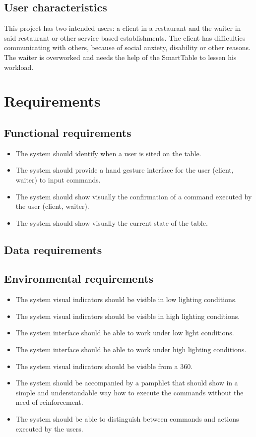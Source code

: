 \documentclass{article}
\begin{document}
\subsection{User characteristics}
This project has two intended users: a client in a restaurant and the waiter in said restaurant or other service based establishments.
The client has difficulties communicating with others, because of social anxiety, disability or other reasons. The waiter is overworked and
needs the help of the SmartTable to lessen his workload.
\section{Requirements}
\subsection{Functional requirements}
\begin{itemize}
    \item The system should identify when a user is sited on the table.
    \item The system should provide a hand gesture interface for the user (client, waiter) to input commands.
    \item The system should show visually the confirmation of a command executed by the user (client, waiter).
    \item The system should show visually the current state of the table.
\end{itemize}
\subsection{Data requirements}
\subsection{Environmental requirements}
\begin{itemize}
    \item The system visual indicators should be visible in low lighting conditions.
    \item The system visual indicators should be visible in high lighting conditions.
    \item The system interface should be able to work under low light conditions.
    \item The system interface should be able to work under high lighting conditions.
    \item The system visual indicators should be visible from a 360.
    \item The system should be accompanied by a pamphlet that should show in a simple and understandable way how to execute the commands without the need of reinforcement.
    \item The system should be able to distinguish between commands and actions executed by the users.
\end{itemize}
\end{document}

